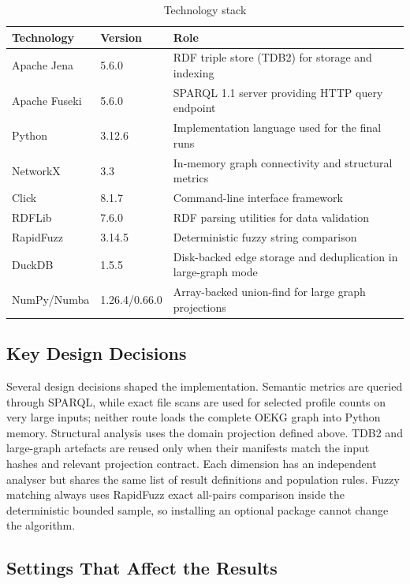 \begin{table}[h]
\centering
\caption{Technology stack}
\label{tab:techstack}
\begin{tabularx}{\textwidth}{llX}
\toprule
\textbf{Technology} & \textbf{Version} & \textbf{Role} \\
\midrule
Apache Jena & 5.6.0 & RDF triple store (TDB2) for storage and indexing \\
Apache Fuseki & 5.6.0 & SPARQL 1.1 server providing HTTP query endpoint \\
Python & 3.12.6 & Implementation language used for the final runs \\
NetworkX & 3.3 & In-memory graph connectivity and structural metrics \\
Click & 8.1.7 & Command-line interface framework \\
RDFLib & 7.6.0 & RDF parsing utilities for data validation \\
RapidFuzz & 3.14.5 & Deterministic fuzzy string comparison \\
DuckDB & 1.5.5 & Disk-backed edge storage and deduplication in large-graph mode \\
NumPy/Numba & 1.26.4/0.66.0 & Array-backed union-find for large graph projections \\
\bottomrule
\end{tabularx}
\end{table}
\clearpage

\subsection{Key Design Decisions}

Several design decisions shaped the implementation. Semantic metrics are queried through SPARQL, while exact file scans are used for selected profile counts on very large inputs; neither route loads the complete OEKG graph into Python memory. Structural analysis uses the domain projection defined above. TDB2 and large-graph artefacts are reused only when their manifests match the input hashes and relevant projection contract. Each dimension has an independent analyser but shares the same list of result definitions and population rules. Fuzzy matching always uses RapidFuzz exact all-pairs comparison inside the deterministic bounded sample, so installing an optional package cannot change the algorithm.

\subsection{Settings That Affect the Results}


